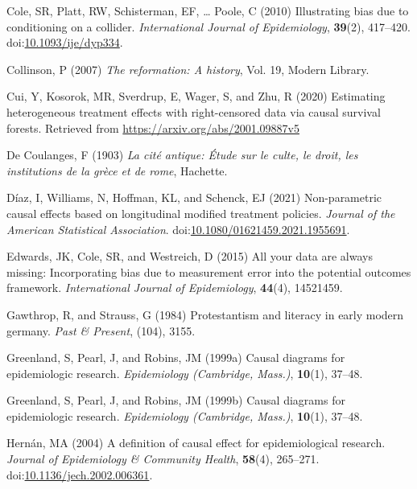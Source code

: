 \documentclass[
  singlecolumn,
  9pt]{article}
\begin{document}
\begin{CSLReferences}
Cole, SR, Platt, RW, Schisterman, EF, \ldots{} Poole, C (2010)
Illustrating bias due to conditioning on a collider. \emph{International
Journal of Epidemiology}, \textbf{39}(2), 417--420.
doi:\href{https://doi.org/10.1093/ije/dyp334}{10.1093/ije/dyp334}.

Collinson, P (2007) \emph{The reformation: A history}, Vol. 19, Modern
Library.

Cui, Y, Kosorok, MR, Sverdrup, E, Wager, S, and Zhu, R (2020) Estimating
heterogeneous treatment effects with right-censored data via causal
survival forests. Retrieved from
\url{https://arxiv.org/abs/2001.09887v5}

De Coulanges, F (1903) \emph{La cité antique: Étude sur le culte, le
droit, les institutions de la grèce et de rome}, Hachette.

Díaz, I, Williams, N, Hoffman, KL, and Schenck, EJ (2021) Non-parametric
causal effects based on longitudinal modified treatment policies.
\emph{Journal of the American Statistical Association}.
doi:\href{https://doi.org/10.1080/01621459.2021.1955691}{10.1080/01621459.2021.1955691}.

Edwards, JK, Cole, SR, and Westreich, D (2015) All your data are always
missing: Incorporating bias due to measurement error into the potential
outcomes framework. \emph{International Journal of Epidemiology},
\textbf{44}(4), 14521459.

Gawthrop, R, and Strauss, G (1984) Protestantism and literacy in early
modern germany. \emph{Past \& Present}, (104), 3155.

Greenland, S, Pearl, J, and Robins, JM (1999a) Causal diagrams for
epidemiologic research. \emph{Epidemiology (Cambridge, Mass.)},
\textbf{10}(1), 37--48.

Greenland, S, Pearl, J, and Robins, JM (1999b) Causal diagrams for
epidemiologic research. \emph{Epidemiology (Cambridge, Mass.)},
\textbf{10}(1), 37--48.

Hernán, MA (2004) A definition of causal effect for epidemiological
research. \emph{Journal of Epidemiology \& Community Health},
\textbf{58}(4), 265--271.
doi:\href{https://doi.org/10.1136/jech.2002.006361}{10.1136/jech.2002.006361}.


\end{CSLReferences}
\end{document}
